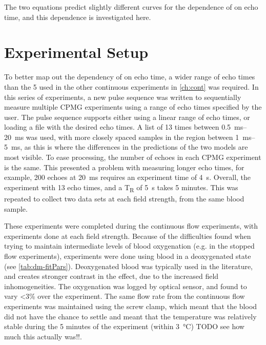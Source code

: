 The two equations predict slightly different curves for the dependence of \Ttwo on echo time, and this dependence is investigated here.

\section{Experimental Setup}
To better map out the dependency of \Ttwo on echo time, a wider range of echo times than the 5 used in the other continuous experiments in \autoref{ch:cont} was required.
In this series of experiments, a new pulse sequence  was written to sequentially measure multiple CPMG experiments using a range of echo times specified by the user.
The pulse sequence supports either using a linear range of echo times, or loading a file with the desired echo times.
A list of 13 times between \SIrange{0.5}{20}{ms} was used, with more closely spaced samples in the region between \SIrange{1}{5}{ms}, as this is where the differences in the predictions of the two models are most visible.
To ease processing, the number of echoes in each CPMG experiment is the same.
This presented a problem with measuring longer echo times, for example, 200 echoes at \SI{20}{ms} requires an experiment time of \SI{4}{\second}.
Overall, the experiment with 13 echo times, and a T\textsubscript{R} of \SI{5}{\second} takes 5 minutes.
This was repeated to collect two data sets at each field strength, from the same blood sample.

These experiments were completed during the continuous flow experiments, with experiments done at each field strength.
Because of the difficulties found when trying to maintain intermediate levels of blood oxygenation (e.g. in the stopped flow experiments), experiments were done using blood in a deoxygenated state (see \autoref{tab:dm-fitPars}).
Deoxygenated blood was typically used in the literature, and creates stronger contrast in the \Ttwo effect, due to the increased field inhomogeneities.
The oxygenation was logged by optical sensor, and found to vary <3\% over the experiment.
The same flow rate from the continuous flow experiments was maintained using the screw clamp, which meant that the blood did not have the chance to settle and meant that the temperature was relatively stable during the 5 minutes of the experiment (within \SI{3}{\celsius}) TODO see how much this actually was!!.

